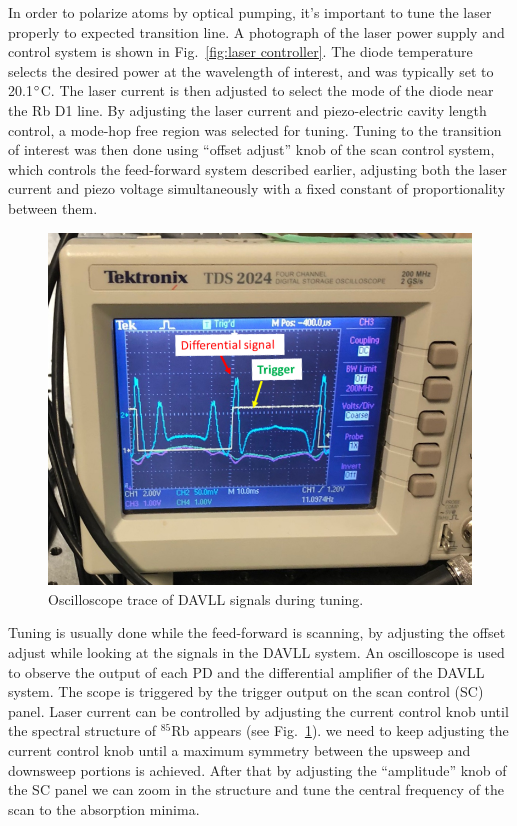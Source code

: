 In order to polarize atoms by optical pumping, it's important to tune
the laser properly to expected transition line.  A photograph of the
laser power supply and control system is shown in
Fig.~\ref{fig:laser controller}.  The diode temperature selects the
desired power at the wavelength of interest, and was typically set to
20.1$\degree$C.  The laser current is then adjusted to select the mode
of the diode near the Rb D1 line.  By adjusting the laser current and
piezo-electric cavity length control, a mode-hop free region was
selected for tuning.  Tuning to the transition of interest was then
done using ``offset adjust'' knob of the scan control system, which
controls the feed-forward system described earlier, adjusting both the
laser current and piezo voltage simultaneously with a fixed constant
of proportionality between them.

\begin{figure}%
\centering
\includegraphics[width=0.85\linewidth]{figures/laser-tune.png}
\caption{Oscilloscope trace of DAVLL signals during
  tuning.\label{fig:laser-tune}}
\end{figure}

Tuning is usually done while the feed-forward is scanning, by
adjusting the offset adjust while looking at the signals in the DAVLL
system.  An oscilloscope is used to observe the output of each PD and
the differential amplifier of the DAVLL system.  The scope is
triggered by the trigger output on the scan control (SC) panel.  Laser
current can be controlled by adjusting the current control knob until
the spectral structure of $^{85}$Rb appears (see
Fig.~\ref{fig:laser-tune}). we need to keep adjusting the current
control knob until a maximum symmetry between the upsweep and
downsweep portions is achieved. After that by adjusting the
``amplitude'' knob of the SC panel we can zoom in the structure and
tune the central frequency of the scan to the absorption minima.

